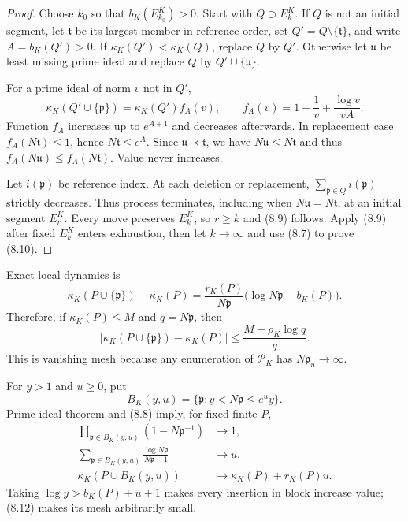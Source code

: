 \documentclass[11pt]{article}
\theoremstyle{definition}
\theoremstyle{remark}
\begin{document}
\begin{proof}
Choose $k_0$ so that $b_K(E_{k_0}^K)>0$.  Start with $Q\supset E_k^K$.  If $Q$ is not an
initial segment, let $\mathfrak t$ be its largest member in reference order, set
$Q'=Q\setminus\{\mathfrak t\}$, and write $A=b_K(Q')>0$.  If
$\kappa_K(Q')<\kappa_K(Q)$, replace $Q$ by $Q'$.  Otherwise let $\mathfrak u$ be least missing
prime ideal and replace $Q$ by $Q'\cup\{\mathfrak u\}$.

For a prime ideal of norm $v$ not in $Q'$,
\[
 \kappa_K(Q'\cup\{\mathfrak p\})=\kappa_K(Q')f_A(v),\qquad
 f_A(v)=1-\frac1v+\frac{\log v}{vA}.
\]
Function $f_A$ increases up to $e^{A+1}$ and decreases afterwards.  In replacement case
$f_A(N\mathfrak t)\leq1$, hence $N\mathfrak t\leq e^A$.  Since
$\mathfrak u\prec\mathfrak t$, we have $N\mathfrak u\leq N\mathfrak t$ and thus
$f_A(N\mathfrak u)\leq f_A(N\mathfrak t)$.  Value never increases.

Let $i(\mathfrak p)$ be reference index.  At each deletion or replacement,
$\sum_{\mathfrak p\in Q}i(\mathfrak p)$ strictly decreases.  Thus process terminates, including
when $N\mathfrak u=N\mathfrak t$, at an initial segment $E_r^K$.  Every move preserves $E_k^K$,
so $r\geq k$ and (8.9) follows.  Apply (8.9) after fixed $E_k^K$ enters exhaustion, then let
$k\to\infty$ and use (8.7) to prove (8.10).
\end{proof}

Exact local dynamics is
\begin{equation}
 \kappa_K(P\cup\{\mathfrak p\})-\kappa_K(P)
 =\frac{r_K(P)}{N\mathfrak p}
   \bigl(\log N\mathfrak p-b_K(P)\bigr).                \tag{8.11}
\end{equation}
Therefore, if $\kappa_K(P)\leq M$ and $q=N\mathfrak p$, then
\begin{equation}
 |\kappa_K(P\cup\{\mathfrak p\})-\kappa_K(P)|
 \leq\frac{M+\rho_K\log q}{q}.                         \tag{8.12}
\end{equation}
This is vanishing mesh because any enumeration of $\mathcal P_K$ has $N\mathfrak p_n\to\infty$.

For $y>1$ and $u\geq0$, put
\[
 B_K(y,u)=\{\mathfrak p:y<N\mathfrak p\leq e^uy\}.
\]
Prime ideal theorem and (8.8) imply, for fixed finite $P$,
\begin{align}
 \prod_{\mathfrak p\in B_K(y,u)}(1-N\mathfrak p^{-1})&\longrightarrow1,
                                                                    \tag{8.13}\\
 \sum_{\mathfrak p\in B_K(y,u)}
       \frac{\log N\mathfrak p}{N\mathfrak p-1}&\longrightarrow u,
                                                                    \tag{8.14}\\
 \kappa_K(P\cup B_K(y,u))&\longrightarrow
             \kappa_K(P)+r_K(P)u.                                 \tag{8.15}
\end{align}
Taking $\log y>b_K(P)+u+1$ makes every insertion in block increase value; (8.12) makes its mesh
arbitrarily small.
\end{document}
